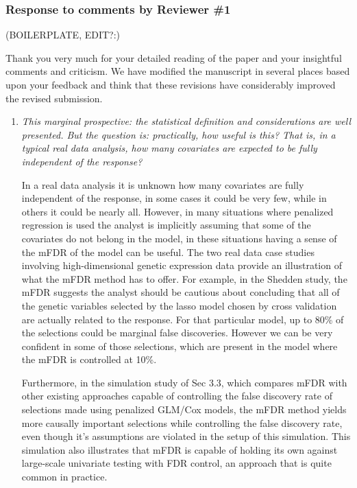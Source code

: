 \documentclass{article}
\begin{document}
\subsubsection*{Response to comments by Reviewer \#1}

(BOILERPLATE, EDIT?:)

Thank you very much for your detailed reading of the paper and your insightful comments and criticism. We have modified the manuscript in several places based upon your feedback and think that these revisions have considerably improved the revised submission.

\begin{enumerate}

\item {\em This marginal prospective: the statistical definition and considerations are well presented. But the question is: practically, how useful is this? That is, in a typical real data analysis, how many covariates are expected to be fully independent of the response?}

In a real data analysis it is unknown how many covariates are fully independent of the response, in some cases it could be very few, while in others it could be nearly all.  However, in many situations where penalized regression is used the analyst is implicitly assuming that some of the covariates do not belong in the model, in these situations having a sense of the mFDR of the model can be useful. The two real data case studies involving high-dimensional genetic expression data provide an illustration of what the mFDR method has to offer.  For example, in the Shedden study, the mFDR suggests the analyst should be cautious about concluding that all of the genetic variables selected by the lasso model chosen by cross validation are actually related to the response.  For that particular model, up to 80\% of the selections could be marginal false discoveries.  However we can be very confident in some of those selections, which are present in the model where the mFDR is controlled at 10\%.

Furthermore, in the simulation study of Sec 3.3, which compares mFDR with other existing approaches capable of controlling the false discovery rate of selections made using penalized GLM/Cox models, the mFDR method yields more causally important selections while controlling the false discovery rate, even though it's assumptions are violated in the setup of this simulation.  This simulation also illustrates that mFDR is capable of holding its own against large-scale univariate testing with FDR control, an approach that is quite common in practice.


\end{enumerate}
\end{document}
